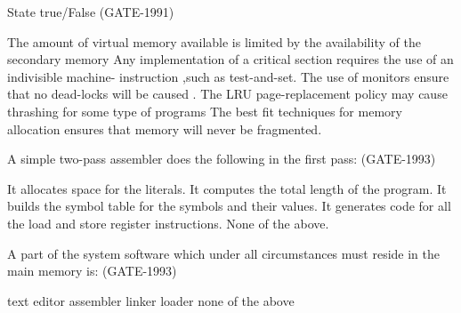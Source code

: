 
\begin{questyle}

  \question  State true/False (GATE-1991)

  \begin{choices}
    \choice The amount of virtual memory available is limited by the availability of the secondary memory
    \choice Any implementation of a critical section requires the use of an indivisible machine- instruction ,such as test-and-set.
    \choice The use of monitors ensure that no dead-locks will be caused .
    \choice The LRU page-replacement policy may cause thrashing for some type of programs
    \choice The best fit techniques for memory allocation ensures that memory will never be fragmented.
  \end{choices}

\end{questyle}


\begin{questyle}

  \question A simple two-pass assembler does the following in the first pass: (GATE-1993)

  \begin{choices}
    \choice It allocates space for the literals.
    \choice It computes the total length of the program.
    \choice It builds the symbol table for the symbols and their values.
    \choice It generates code for all the load and store register instructions.
    \choice None of the above.
  \end{choices}

\end{questyle}


\begin{questyle}

  \question  A part of the system software which under all circumstances must reside in the main memory is: (GATE-1993)

  \begin{choices}
    \choice text editor
    \choice assembler
    \choice linker
    \correctchoice loader
    \choice none of the above
  \end{choices}

\end{questyle}


